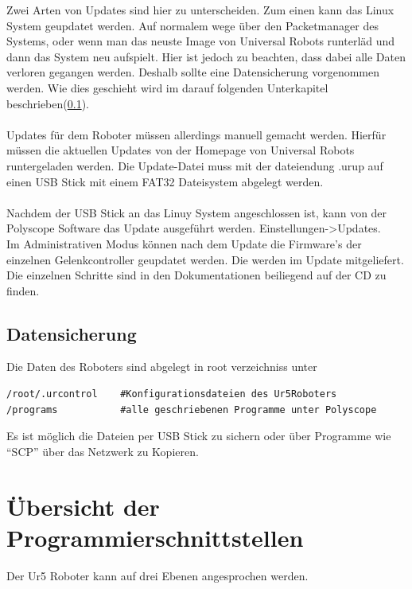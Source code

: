 Zwei Arten von Updates sind hier zu unterscheiden. Zum einen kann das Linux System geupdatet werden. Auf normalem wege über den Packetmanager des Systems, oder wenn man das neuste Image von Universal Robots runterläd und dann das System neu aufspielt. Hier ist jedoch zu beachten, dass dabei alle Daten verloren gegangen werden. Deshalb sollte eine Datensicherung vorgenommen werden. Wie dies geschieht wird im darauf folgenden Unterkapitel beschrieben(\ref{ur_datensicherung_gru}).
\\\\
Updates für dem Roboter müssen allerdings manuell gemacht werden. Hierfür müssen die aktuellen Updates von der Homepage von Universal Robots runtergeladen werden. Die Update-Datei muss mit der dateiendung .urup auf einen USB Stick mit einem FAT32 Dateisystem abgelegt werden.\\\\
Nachdem der USB Stick an das Linuy System angeschlossen ist, kann von der Polyscope Software das Update ausgeführt werden. Einstellungen->Updates.\\
Im Administrativen Modus können nach dem Update die Firmware's der einzelnen Gelenkcontroller geupdatet werden. Die werden im Update mitgeliefert. Die einzelnen Schritte sind in den Dokumentationen beiliegend auf der CD zu finden.

\subsection{Datensicherung}
\label{ur_datensicherung_gru}

Die Daten des Roboters sind abgelegt in root verzeichniss unter 

\begin{lstlisting}[caption={Pfade Der Ur5 Relevanten Dateien}, label=lst:ur5data ,captionpos=b] 
/root/.urcontrol    #Konfigurationsdateien des Ur5Roboters
/programs   		#alle geschriebenen Programme unter Polyscope
\end{lstlisting}

Es ist möglich die Dateien per USB Stick zu sichern oder über Programme wie ``SCP'' über das Netzwerk zu Kopieren.

\section{Übersicht der Programmierschnittstellen}
\label{sec:programm_api_uebersicht_gru}

Der Ur5 Roboter kann auf drei Ebenen angesprochen werden.\\


